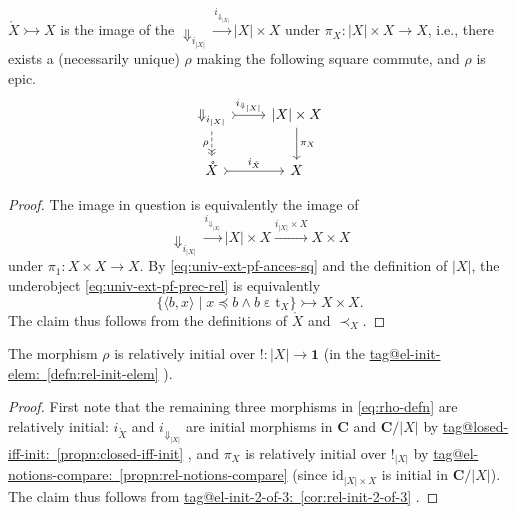 \documentclass{amsart}
\makeatletter
\newcommand\abs[2][]{#1\lvert{#2}#1\rvert}
\newcommand\bC{\mathbf{C}}
\newcommand\br[1]{\langle{}#1\rangle{}}
\newcommand\Dwn{{\Downarrow}}
\newcommand\ein{\mathrel{\varepsilon}}
\newcommand\id{\mathrm{id}}
\newcommand\oring[1]{\mathring{#1}}
\newcommand\rt{\mathrm{t}}
\newcommand\set[2][]{#1\{ #2 #1\}}
\newcommand\tm{\mathbf{1}}
\newcommand\tox[2][]{\xrightarrow[#1]{#2}}
\newcommand\tto{\rightarrowtail}
\newcommand\unex{{!}}
\newcommand\tagword[1]{\csname tag@#1\endcsname}
\def\label@tag#1:#2\@nil{#1}
\newcommand\labeltag[1]{\label@tag#1:\@nil}
\newcommand\jref[1]{%
  \texorpdfstring%
    {\hyperref[#1]{\tagword{\labeltag{#1}}~\ref*{#1}}}%
    {\tagword{\labeltag{#1}}~\ref*{#1}}%
}
\theoremstyle{definition}
\theoremstyle{remark}
\theoremstyle{plainwithref}
\makeatother
\begin{document}
\begin{claim} \label{claim:rho-exists}
  \( \oring X \tto X \) is the image of the \( \Dwn_{i_{\abs X}} \tox{i_{\Dwn_{\abs{X}}}} \abs X \times X \) under \( \pi_X \colon \abs{X} \times X \to X \), i.e., there exists a (necessarily unique) \( \rho \) making the following square commute, and \( \rho \) is epic.
  \begin{equation}\label{eq:rho-defn}
    \begin{tikzcd}
      \Dwn_{i_{\abs X}} \ar[r, "i_{\Dwn_{\abs{X}}}", >->] \ar[d, "\rho"', ->>, dashed] & \abs X \times X \ar[d, "\pi_X"] \\
      \oring X \ar[r, "i_{\oring X}", >->] & X
    \end{tikzcd}
\end{equation}
\end{claim}

\begin{proof}
  The image in question is equivalently the image of
  \begin{equation} \label{eq:univ-ext-pf-prec-rel}
    \Dwn_{i_{\abs X}} \tox{i_{\Dwn_{\abs{X}}}} \abs X \times X \tox{i_{\abs X} \times X} X \times X
  \end{equation}
  under \( \pi_1 \colon X \times X \to X \).
  By \eqref{eq:univ-ext-pf-ances-sq} and the definition of \( \abs{X} \), the underobject \eqref{eq:univ-ext-pf-prec-rel} is equivalently
  \[
    \set{ \br{b, x} \mid x \preceq b \wedge b \ein \rt_X } \tto X \times X.
  \]
  The claim thus follows from the definitions of \( \oring X \) and \( \prec_X \).
\end{proof}

\begin{claim} \label{claim:rho-init}
  The morphism \( \rho \) is relatively initial over \( \unex \colon \abs X \to \tm \) (in the \jref{defn:rel-init-elem}).
\end{claim}

\begin{proof}
  First note that the remaining three morphisms in \eqref{eq:rho-defn} are relatively initial: \( i_{\oring X} \) and \( i_{\Dwn_{\abs X}} \) are initial morphisms in \( \bC \) and \( \bC / \abs{X} \) by \jref{propn:closed-iff-init}, and \( \pi_X \) is relatively initial over \( \unex_{\abs X} \) by \jref{propn:rel-notions-compare} (since \( \id_{\abs{X} \times X} \) is initial in \( \bC / \abs{X} \)).
  The claim thus follows from \jref{cor:rel-init-2-of-3}.
\end{proof}
\end{document}
